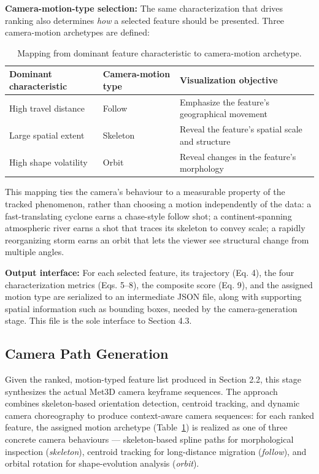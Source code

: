 \documentclass[journal abbreviation, manuscript]{copernicus}
\begin{document}
\textbf{Camera-motion-type selection:} The same characterization that drives ranking also determines \textit{how} a selected feature should be presented. Three camera-motion archetypes are defined:

\begin{table}[htbp]
\centering
\caption{Mapping from dominant feature characteristic to camera-motion archetype.}
\label{tab:camera-motion}
\begin{tabular}{lll}
\hline
\textbf{Dominant characteristic} &
\textbf{Camera-motion type} &
\textbf{Visualization objective} \\
\hline
High travel distance &
Follow &
Emphasize the feature's geographical movement \\

Large spatial extent &
Skeleton &
Reveal the feature's spatial scale and structure \\

High shape volatility &
Orbit &
Reveal changes in the feature's morphology \\
\hline
\end{tabular}
\end{table}

This mapping ties the camera's behaviour to a measurable property of the tracked phenomenon, rather than choosing a motion independently of the data: a fast-translating cyclone earns a chase-style follow shot; a continent-spanning atmospheric river earns a shot that traces its skeleton to convey scale; a rapidly reorganizing storm earns an orbit that lets the viewer see structural change from multiple angles.

\textbf{Output interface:} For each selected feature, its trajectory (Eq. 4), the four characterization metrics (Eqs. 5--8), the composite score (Eq. 9), and the assigned motion type are serialized to an intermediate JSON file, along with supporting spatial information such as bounding boxes, needed by the camera-generation stage. This file is the sole interface to Section 4.3.


\subsection{Camera Path Generation}

Given the ranked, motion-typed feature list produced in Section 2.2, this stage synthesizes the actual Met3D camera keyframe sequences. The approach combines skeleton-based orientation detection, centroid tracking, and dynamic camera choreography to produce context-aware camera sequences: for each ranked feature, the assigned motion archetype (Table~\ref{tab:camera-motion}) is realized as one of three concrete camera behaviours --- skeleton-based spline paths for morphological inspection (\textit{skeleton}), centroid tracking for long-distance migration (\textit{follow}), and orbital rotation for shape-evolution analysis (\textit{orbit}).
\end{document}

